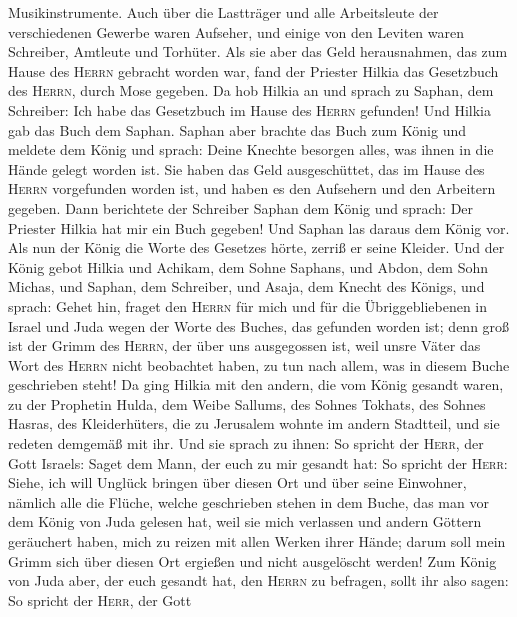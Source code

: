 Musikinstrumente.  Auch über die Lastträger und alle
Arbeitsleute der verschiedenen Gewerbe waren Aufseher, und einige von
den Leviten waren Schreiber, Amtleute und Torhüter.  Als
sie aber das Geld herausnahmen, das zum Hause des \textsc{Herrn}
gebracht worden war, fand der Priester Hilkia das Gesetzbuch des
\textsc{Herrn}, durch Mose gegeben.  Da hob Hilkia an und
sprach zu Saphan, dem Schreiber: Ich habe das Gesetzbuch im Hause des
\textsc{Herrn} gefunden! Und Hilkia gab das Buch dem Saphan.
 Saphan aber brachte das Buch zum König und meldete dem
König und sprach: Deine Knechte besorgen alles, was ihnen in die Hände
gelegt worden ist.  Sie haben das Geld ausgeschüttet, das
im Hause des \textsc{Herrn} vorgefunden worden ist, und haben es den
Aufsehern und den Arbeitern gegeben.  Dann berichtete der
Schreiber Saphan dem König und sprach: Der Priester Hilkia hat mir ein
Buch gegeben! Und Saphan las daraus dem König vor.  Als
nun der König die Worte des Gesetzes hörte, zerriß er seine Kleider.
 Und der König gebot Hilkia und Achikam, dem Sohne
Saphans, und Abdon, dem Sohn Michas, und Saphan, dem Schreiber, und
Asaja, dem Knecht des Königs, und sprach:  Gehet hin,
fraget den \textsc{Herrn} für mich und für die Übriggebliebenen in
Israel und Juda wegen der Worte des Buches, das gefunden worden ist;
denn groß ist der Grimm des \textsc{Herrn}, der über uns ausgegossen
ist, weil unsre Väter das Wort des \textsc{Herrn} nicht beobachtet
haben, zu tun nach allem, was in diesem Buche geschrieben steht!
 Da ging Hilkia mit den andern, die vom König gesandt
waren, zu der Prophetin Hulda, dem Weibe Sallums, des Sohnes Tokhats,
des Sohnes Hasras, des Kleiderhüters, die zu Jerusalem wohnte im andern
Stadtteil, und sie redeten demgemäß mit ihr.  Und sie
sprach zu ihnen: So spricht der \textsc{Herr}, der Gott Israels: Saget
dem Mann, der euch zu mir gesandt hat:  So spricht der
\textsc{Herr}: Siehe, ich will Unglück bringen über diesen Ort und über
seine Einwohner, nämlich alle die Flüche, welche geschrieben stehen in
dem Buche, das man vor dem König von Juda gelesen hat, 
weil sie mich verlassen und andern Göttern geräuchert haben, mich zu
reizen mit allen Werken ihrer Hände; darum soll mein Grimm sich über
diesen Ort ergießen und nicht ausgelöscht werden!  Zum
König von Juda aber, der euch gesandt hat, den \textsc{Herrn} zu
befragen, sollt ihr also sagen: So spricht der \textsc{Herr}, der Gott
